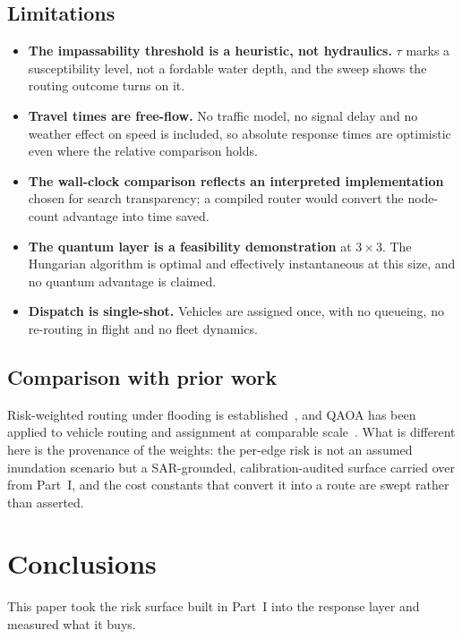 \documentclass[journal]{IEEEtran}
\begin{document}
\subsection{Limitations}
\label{sec:limitations}
\begin{itemize}
\item \textbf{The impassability threshold is a heuristic, not hydraulics.}
      $\tau$ marks a susceptibility level, not a fordable water depth, and the
      sweep shows the routing outcome turns on it.
\item \textbf{Travel times are free-flow.} No traffic model, no signal delay and
      no weather effect on speed is included, so absolute response times are
      optimistic even where the relative comparison holds.
\item \textbf{The wall-clock comparison reflects an interpreted implementation}
      chosen for search transparency; a compiled router would convert the
      node-count advantage into time saved.
\item \textbf{The quantum layer is a feasibility demonstration} at $3\times3$.
      The Hungarian algorithm is optimal and effectively instantaneous at this
      size, and no quantum advantage is claimed.
\item \textbf{Dispatch is single-shot.} Vehicles are assigned once, with no
      queueing, no re-routing in flight and no fleet dynamics.
\end{itemize}

\subsection{Comparison with prior work}
Risk-weighted routing under flooding is established~\cite{zhang2019,yin2016},
and QAOA has been applied to vehicle routing and assignment at comparable
scale~\cite{farhi2014,lucas2014,zhou2020}. What is different here is the
provenance of the weights: the per-edge risk is not an assumed inundation
scenario but a SAR-grounded, calibration-audited surface carried over from
Part~I, and the cost constants that convert it into a route are swept rather
than asserted.
\section{Conclusions}
This paper took the risk surface built in Part~I into the response layer and
measured what it buys.
\end{document}
